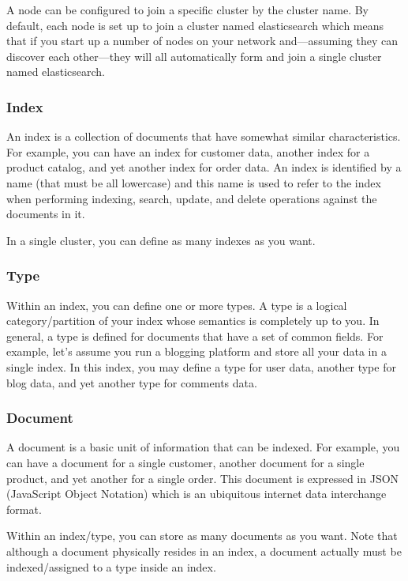 \documentclass[a4paper, 12pt]{book}
\begin{document}
A node can be configured to join a specific cluster by the cluster name. By default, each node is set up to join a cluster named elasticsearch which means that if you start up a number of nodes on your network and—assuming they can discover each other—they will all automatically form and join a single cluster named elasticsearch.

\subsubsection{Index}
An index is a collection of documents that have somewhat similar characteristics. For example, you can have an index for customer data, another index for a product catalog, and yet another index for order data. An index is identified by a name (that must be all lowercase) and this name is used to refer to the index when performing indexing, search, update, and delete operations against the documents in it.

In a single cluster, you can define as many indexes as you want.

\subsubsection{Type}
Within an index, you can define one or more types. A type is a logical category/partition of your index whose semantics is completely up to you. In general, a type is defined for documents that have a set of common fields. For example, let’s assume you run a blogging platform and store all your data in a single index. In this index, you may define a type for user data, another type for blog data, and yet another type for comments data.

\subsubsection{Document}
A document is a basic unit of information that can be indexed. For example, you can have a document for a single customer, another document for a single product, and yet another for a single order. This document is expressed in JSON (JavaScript Object Notation) which is an ubiquitous internet data interchange format.

Within an index/type, you can store as many documents as you want. Note that although a document physically resides in an index, a document actually must be indexed/assigned to a type inside an index.
\end{document}

